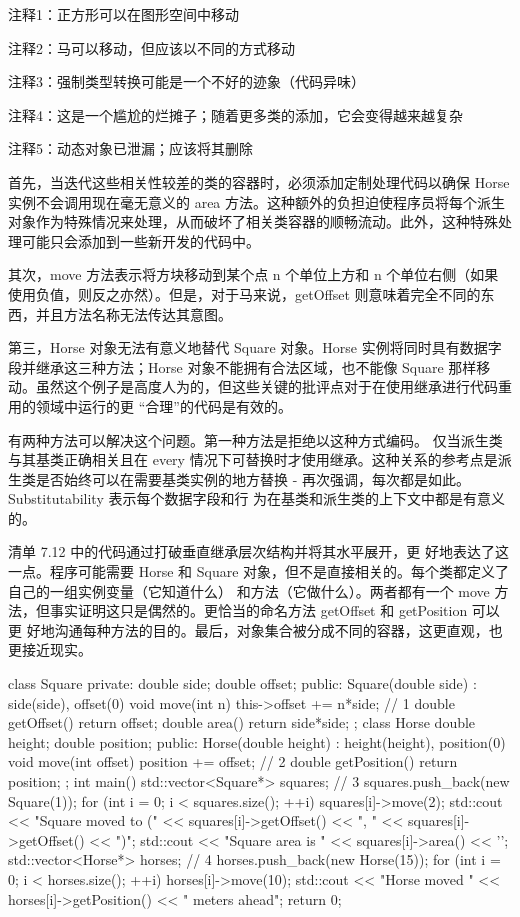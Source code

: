 {\footnotesize
注释1：正方形可以在图形空间中移动

注释2：马可以移动，但应该以不同的方式移动

注释3：强制类型转换可能是一个不好的迹象（代码异味）

注释4：这是一个尴尬的烂摊子；随着更多类的添加，它会变得越来越复杂

注释5：动态对象已泄漏；应该将其删除
}

首先，当迭代这些相关性较差的类的容器时，必须添加定制处理代码以确保 Horse 实例不会调用现在毫无意义的 area 方法。这种额外的负担迫使程序员将每个派生对象作为特殊情况来处理，从而破坏了相关类容器的顺畅流动。此外，这种特殊处理可能只会添加到一些新开发的代码中。

其次，move 方法表示将方块移动到某个点 n 个单位上方和 n 个单位右侧（如果使用负值，则反之亦然）。但是，对于马来说，getOffset 则意味着完全不同的东西，并且方法名称无法传达其意图。

第三，Horse 对象无法有意义地替代 Square 对象。Horse 实例将同时具有数据字段并继承这三种方法；Horse 对象不能拥有合法区域，也不能像 Square 那样移动。虽然这个例子是高度人为的，但这些关键的批评点对于在使用继承进行代码重用的领域中运行的更 “合理”的代码是有效的。


有两种方法可以解决这个问题。第一种方法是拒绝以这种方式编码。
仅当派生类与其基类正确相关且在 every 情况下可替换时才使用继承。这种关系的参考点是派生类是否始终可以在需要基类实例的地方替换 - 再次强调，每次都是如此。Substitutability 表示每个数据字段和行 为在基类和派生类的上下文中都是有意义的。

清单 7.12 中的代码通过打破垂直继承层次结构并将其水平展开，更 好地表达了这一点。程序可能需要 Horse 和 Square 对象，但不是直接相关的。每个类都定义了自己的一组实例变量（它知道什么） 和方法（它做什么）。两者都有一个 move 方法，但事实证明这只是偶然的。更恰当的命名方法 getOffset 和 getPosition 可以更 好地沟通每种方法的目的。最后，对象集合被分成不同的容器，这更直观，也更接近现实。


\begin{cpp}
class Square {
private:
  double side;
  double offset;
public:
  Square(double side) : side(side), offset(0) {}
  void move(int n) { this->offset += n*side; } // 1
  double getOffset() { return offset; }
  double area() { return side*side; }
};
class Horse {
  double height;
  double position;
public:
  Horse(double height) : height(height), position(0) {}
  void move(int offset) { position += offset; } // 2
  double getPosition() { return position; }
};
int main() {
  std::vector<Square*> squares; // 3
  squares.push_back(new Square(1));
  for (int i = 0; i < squares.size(); ++i) {
    squares[i]->move(2);
    std::cout << "Square moved to (" << squares[i]->getOffset()
      << ", " << squares[i]->getOffset() << ")\n";
    std::cout << "Square area is " << squares[i]->area() << '\n';
  }
  std::vector<Horse*> horses; // 4
  horses.push_back(new Horse(15));
  for (int i = 0; i < horses.size(); ++i) {
    horses[i]->move(10);
    std::cout << "Horse moved " << horses[i]->getPosition()
    << " meters ahead\n";
  }
  return 0;
}
\end{cpp}

